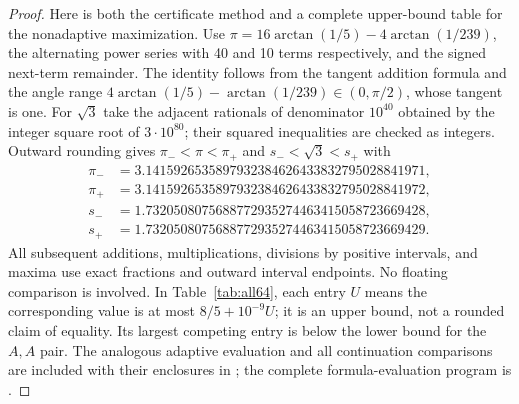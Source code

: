 \begin{proof}
Here is both the certificate method and a complete upper-bound table for
the nonadaptive maximization. Use
$\pi=16\arctan(1/5)-4\arctan(1/239)$, the alternating power series with
40 and 10 terms respectively, and the signed next-term remainder. The
identity follows from the tangent addition formula and the angle range
$4\arctan(1/5)-\arctan(1/239)\in(0,\pi/2)$, whose tangent is one.
For $\sqrt3$ take the adjacent rationals of denominator $10^{40}$ obtained
by the integer square root of $3\cdot10^{80}$; their squared inequalities
are checked as integers. Outward rounding gives $\pi_-<\pi<\pi_+$ and $s_-<\sqrt3<s_+$ with
\[
 \begin{aligned}
 \pi_-&=3.1415926535897932384626433832795028841971,\\
 \pi_+&=3.1415926535897932384626433832795028841972,\\
 s_-&=1.7320508075688772935274463415058723669428,\\
 s_+&=1.7320508075688772935274463415058723669429.
 \end{aligned}
\]
All subsequent additions, multiplications, divisions by positive intervals,
and maxima use exact fractions and outward interval endpoints. No floating
comparison is involved. In Table~\ref{tab:all64}, each entry $U$ means the
corresponding value is at most $8/5+10^{-9}U$; it is an upper bound, not a
rounded claim of equality. Its largest competing entry is below the lower
bound for the $A,A$ pair. The analogous adaptive evaluation and all
continuation comparisons are included with their enclosures in
; the complete formula-evaluation
program is .


\end{proof}
